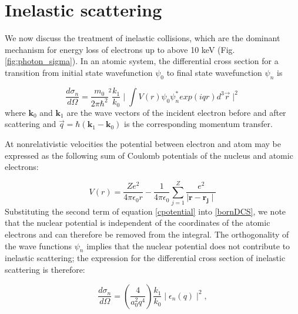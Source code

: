 \documentclass [11pt, proquest, article] {uwthesis}[2016/11/22]
\begin{document}

\section{Inelastic scattering}
We now discuss the treatment of inelastic collisions, which are the dominant mechanism for energy loss of electrons up to above 10 keV (Fig. \ref{fig:photon_sigma}).  In an atomic system, the differential cross section for a transition from initial state wavefunction $\psi_0$ to final state wavefunction $\psi_n$ is

\begin{equation} \label{bornDCS}
\frac{d\sigma_n}{d\Omega} = \frac{m_0}{2\pi \hbar^2}^2 \frac{k_1}{k_0} \mid \int V(r) \psi_0 \psi_n^* exp(i q r) d^3\vec{r} \mid ^2
\end{equation}
where $\textbf{k}_0$ and $\textbf{k}_1$ are the wave vectors of the incident electron before and after scattering and $\vec{q} = \hbar (\textbf{k}_1 - \textbf{k}_0)$ is the corresponding momentum transfer.\cite{fano1963penetration} 

At nonrelativistic velocities the potential between electron and atom may be expressed as the following sum of Coulomb potentials of the nucleus and atomic electrons:

\begin{equation} \label{cpotential}
V(r) = \frac{Ze^2}{4\pi \epsilon_0 r} - \frac{1}{4 \pi \epsilon_0} \sum_{j = 1}^Z \frac{e^2}{\mid \mathbf{r} - \mathbf{r_j} \mid}
\end{equation}
Substituting the second term of equation \ref{cpotential} into \ref{bornDCS}, we note that the nuclear potential is independent of the coordinates of the atomic electrons and can therefore be removed from the integral. The orthogonality of the wave functions $\psi_n$ implies that the nuclear potential does not contribute to inelastic scattering; the expression for the differential cross section of inelastic scattering is therefore:

\begin{equation} \label{inelasticDCS}
\frac{d\sigma_n}{d\Omega} = (\frac{4}{a_0^2 q^4}) \frac{k_1}{k_0} \mid \epsilon_n(q)\mid^2,
\end{equation}
\end{document}

